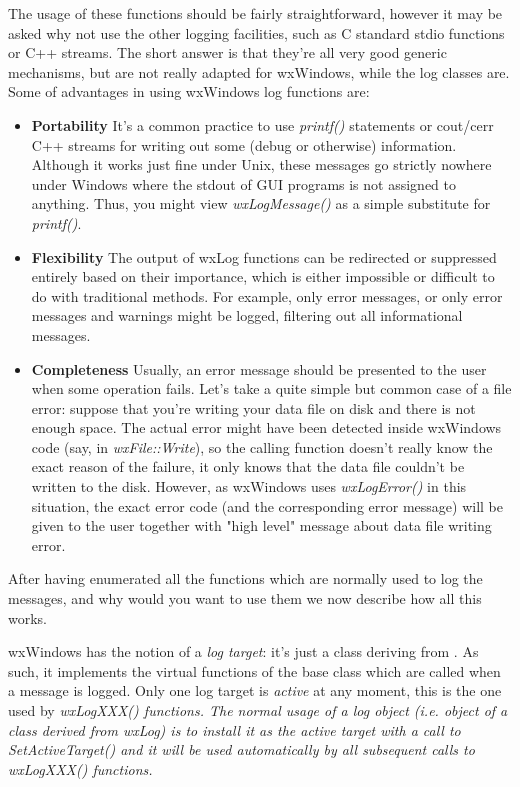 The usage of these functions should be fairly straightforward, however it may
be asked why not use the other logging facilities, such as C standard stdio
functions or C++ streams. The short answer is that they're all very good
generic mechanisms, but are not really adapted for wxWindows, while the log
classes are. Some of advantages in using wxWindows log functions are:

\begin{itemize}\itemsep=0pt
\item{\bf Portability} It's a common practice to use {\it printf()} statements or
cout/cerr C++ streams for writing out some (debug or otherwise) information.
Although it works just fine under Unix, these messages go strictly nowhere
under Windows where the stdout of GUI programs is not assigned to anything.
Thus, you might view {\it wxLogMessage()} as a simple substitute for {\it
printf()}.
\item{\bf Flexibility} The output of wxLog functions can be redirected or
suppressed entirely based on their importance, which is either impossible or
difficult to do with traditional methods. For example, only error messages, or
only error messages and warnings might be logged, filtering out all
informational messages.
\item{\bf Completeness} Usually, an error message should be presented to the user
when some operation fails. Let's take a quite simple but common case of a file
error: suppose that you're writing your data file on disk and there is not
enough space. The actual error might have been detected inside wxWindows code
(say, in {\it wxFile::Write}), so the calling function doesn't really know the
exact reason of the failure, it only knows that the data file couldn't be
written to the disk. However, as wxWindows uses {\it wxLogError()} in this
situation, the exact error code (and the corresponding error message) will be
given to the user together with "high level" message about data file writing
error.
\end{itemize}

After having enumerated all the functions which are normally used to log the
messages, and why would you want to use them we now describe how all this
works.

wxWindows has the notion of a {\it log target}: it's just a class deriving
from . As such, it implements the virtual functions of
the base class which are called when a message is logged. Only one log target
is {\it active} at any moment, this is the one used by \it{wxLogXXX()}
functions. The normal usage of a log object (i.e. object of a class derived
from wxLog) is to install it as the active target with a call to {\it
SetActiveTarget()} and it will be used automatically by all subsequent calls
to {\it wxLogXXX()} functions.

